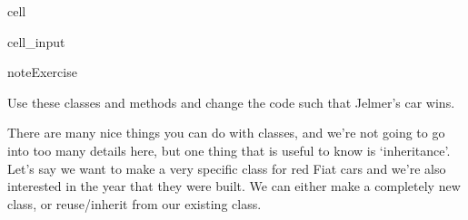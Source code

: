 \documentclass[letterpaper,10pt,english]{jupyterBook}
\begin{document}
\begin{sphinxuseclass}{cell}\begin{sphinxVerbatimInput}

\begin{sphinxuseclass}{cell_input}
\begin{sphinxVerbatim}[commandchars=\\\{\}]
  
       
       
        
       
\end{sphinxVerbatim}

\end{sphinxuseclass}\end{sphinxVerbatimInput}

\end{sphinxuseclass}
\begin{sphinxadmonition}{note}{Exercise}

\sphinxAtStartPar
Use these classes and methods and change the code such that Jelmer’s car wins.
\end{sphinxadmonition}

\sphinxAtStartPar
There are many nice things you can do with classes, and we’re not going to go into too many details here, but one thing that is useful to know is ‘inheritance’. Let’s say we want to make a very specific class for red Fiat cars and we’re also interested in the year that they were built. We can either make a completely new class, or reuse/inherit from our existing  class.
\end{document}
